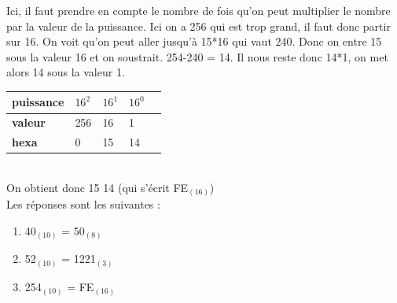 \begin{Exercice}[15 minutes]
\begin{solution}
        Ici, il faut prendre en compte le nombre de fois qu'on peut multiplier le nombre par la valeur de la puissance. Ici on a 256 qui est trop grand, il faut donc partir sur 16. On voit qu'on peut aller jusqu'à 15*16 qui vaut 240. Donc on entre 15 sous la valeur 16 et on soustrait. 254-240 = 14. Il nous reste donc 14*1, on met alors 14 sous la valeur 1. \\
        
   		\begin{tabular}{| C{0.1\textwidth} | C{0.1\textwidth} | C{0.1\textwidth} | C{0.1\textwidth} | C{0.1\textwidth} |} 
            \hline
            \textbf{puissance} & $16^{2}$ & $16^{1}$ & $16^{0}$ \\ [0.5ex] 
            \hline
            \textbf{valeur} & 256 & 16 & 1 \\ [0.5ex] 
            \hline
            \textbf{hexa} & 0 & 15 & 14 \\ [0.5ex] 
            \hline
        \end{tabular} \\
        
        On obtient donc 15 14 (qui s'écrit FE$_{(16)}$)\\
        
        Les réponses sont les suivantes :
        \begin{enumerate}
        \item 40$_{(10)}$ = 50$_{(8)}$
        \item 52$_{(10)}$ = 1221$_{(3)}$
        \item 254$_{(10)}$ = FE$_{(16)}$
        \end{enumerate}
    \end{solution}
\end{Exercice}

